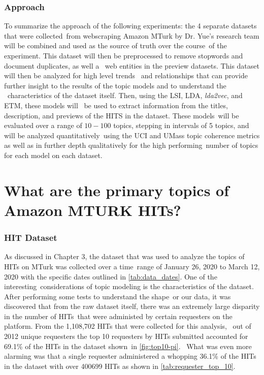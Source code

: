 \documentclass[letterpaper,12pt]{article}
\begin{document}
\subsection{Approach}
To summarize the approach of the following experiments: the 4 separate datasets that were collected\
from webscraping Amazon MTurk by Dr. Yue's research team will be combined and used as the source of truth over the course\
of the experiment. This dataset will then be preprocessed to remove stopwords and document duplicates, as well a \
web entities in the preview datasets. This dataset will then be analyzed for high level trends \
and relationships that can provide further insight to the results of the topic models and to understand the \
characteristics of the dataset itself. Then, using the LSI, LDA, \emph{lda2vec}, and ETM, these models will \
be used to extract information from the titles, description, and previews of the HITS in the dataset. These models\
will be evaluated over a range of $10-100$ topics, stepping in intervals of 5 topics, and will be analyzed quantitatively\
using the UCI and UMass topic coherence metrics as well as in further depth qualitatively for the high performing\
number of topics for each model on each dataset. 

\chapter{What are the primary topics of Amazon MTURK HITs?}

\subsection{HIT Dataset}
As discussed in Chapter 3, the dataset that was used to analyze the topics of HITs on MTurk was collected over a time\
range of January 26, 2020 to March 12, 2020 with the specific dates outlined in \ref{tab:data_dates}. One of the interesting\
considerations of topic modeling is the characteristics of the dataset. After performing some tests to understand the shape\
or our data, it was discovered that from the raw dataset itself, there was an extremely large disparity in the number of HITs\
that were administed by certain requesters on the platform. From the 1,108,702 HITs that were collected for this analysis, \
out of 2012 unique requesters the top 10 requesters by HITs submitted accounted for 69.1\% of the HITs in the dataset shown\
in \ref{fig:top10-pi}. \
What was even more alarming was that a single requester administered a whopping 36.1\% of the HITs in the dataset with 
over 400699 HITs as shown in \ref{tab:requester_top_10}. \
\end{document}
